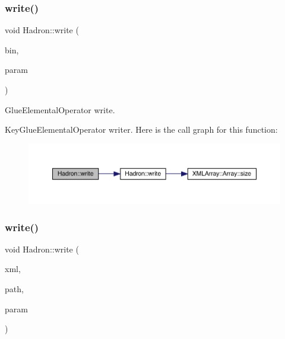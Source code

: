 \subsubsection{\texorpdfstring{write()}{write()}\hspace{0.1cm}{\footnotesize\ttfamily [46/95]}}
{\footnotesize\ttfamily void Hadron\+::write (\begin{DoxyParamCaption}\item[{\mbox{\hyperlink{classADATIO_1_1BinaryWriter}{Binary\+Writer}} \&}]{bin,  }\item[{const \mbox{\hyperlink{structHadron_1_1KeyGlueElementalOperator__t}{Key\+Glue\+Elemental\+Operator\+\_\+t}} \&}]{param }\end{DoxyParamCaption})}



Glue\+Elemental\+Operator write. 

Key\+Glue\+Elemental\+Operator writer. Here is the call graph for this function\+:
\nopagebreak
\begin{figure}[H]
\begin{center}
\leavevmode
\includegraphics[width=350pt]{d1/daf/namespaceHadron_a91e2c5264aeab6dfb2be779cf7140626_cgraph}
\end{center}
\end{figure}
\mbox{\label{namespaceHadron_a2737e3c3e39c76c6dbe81ce5e484f6cc}} 
\subsubsection{\texorpdfstring{write()}{write()}\hspace{0.1cm}{\footnotesize\ttfamily [47/95]}}
{\footnotesize\ttfamily void Hadron\+::write (\begin{DoxyParamCaption}\item[{\mbox{\hyperlink{classADATXML_1_1XMLWriter}{X\+M\+L\+Writer}} \&}]{xml,  }\item[{const std\+::string \&}]{path,  }\item[{const \mbox{\hyperlink{structHadron_1_1HadronQuarkLocation__t}{Hadron\+Quark\+Location\+\_\+t}} \&}]{param }\end{DoxyParamCaption})}



